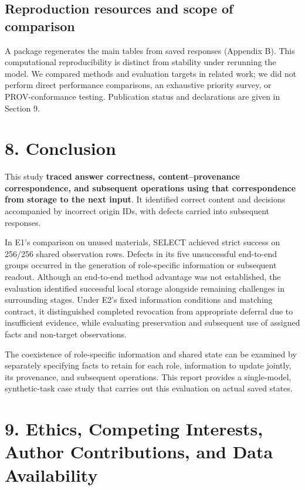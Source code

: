\documentclass[10pt,a4paper]{article}
\begin{document}
\subsection{Reproduction resources and scope of comparison}\label{paper-01-reproduction-resources-and-scope-of-comparison}

A package regenerates the main tables from saved responses (Appendix B). This computational reproducibility is distinct from stability under rerunning the model. We compared methods and evaluation targets in related work; we did not perform direct performance comparisons, an exhaustive priority survey, or PROV-conformance testing. Publication status and declarations are given in Section 9.

\section{8. Conclusion}\label{paper-01-conclusion}

This study \textbf{traced answer correctness, content--provenance correspondence, and subsequent operations using that correspondence from storage to the next input}. It identified correct content and decisions accompanied by incorrect origin IDs, with defects carried into subsequent responses.

In E1's comparison on unused materials, SELECT achieved strict success on 256/256 shared observation rows. Defects in its five unsuccessful end-to-end groups occurred in the generation of role-specific information or subsequent readout. Although an end-to-end method advantage was not established, the evaluation identified successful local storage alongside remaining challenges in surrounding stages. Under E2's fixed information conditions and matching contract, it distinguished completed revocation from appropriate deferral due to insufficient evidence, while evaluating preservation and subsequent use of assigned facts and non-target observations.

The coexistence of role-specific information and shared state can be examined by separately specifying facts to retain for each role, information to update jointly, its provenance, and subsequent operations. This report provides a single-model, synthetic-task case study that carries out this evaluation on actual saved states.

\section{9. Ethics, Competing Interests, Author Contributions, and Data Availability}\label{paper-01-ethics-competing-interests-author-contributions-and-data-availability}
\end{document}
